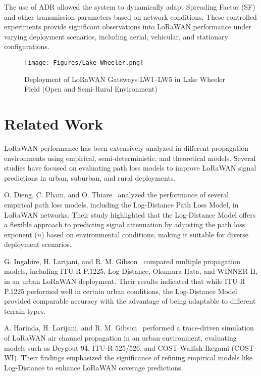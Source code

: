 \documentclass[journal]{IEEEtran}
\begin{document}
The use of ADR allowed the system to dynamically adapt Spreading Factor (SF) and other transmission parameters based on network conditions. These controlled experiments provide significant observations into LoRaWAN performance under varying deployment scenarios, including aerial, vehicular, and stationary configurations.

\begin{figure}[!t]
    \centering
    \texttt{[image: Figures/Lake Wheeler.png]}
    \caption{Deployment of LoRaWAN Gateways LW1–LW5 in Lake Wheeler Field (Open and Semi-Rural Environment)}
    \label{fig:LW}
\end{figure}

\section{Related Work}\label{sec:related_work}

LoRaWAN performance has been extensively analyzed in different propagation environments using empirical, semi-deterministic, and theoretical models. Several studies have focused on evaluating path loss models to improve LoRaWAN signal predictions in urban, suburban, and rural deployments.

O. Dieng, C. Pham, and O. Thiare~\cite{Dieng2020ComparingNetworks} analyzed the performance of several empirical path loss models, including the Log-Distance Path Loss Model, in LoRaWAN networks. Their study highlighted that the Log-Distance Model offers a flexible approach to predicting signal attenuation by adjusting the path loss exponent ($n$) based on environmental conditions, making it suitable for diverse deployment scenarios.

G. Ingabire, H. Larijani, and R. M. Gibson~\cite{Ingabire2020PerformanceEnvironment} compared multiple propagation models, including ITU-R P.1225, Log-Distance, Okumura-Hata, and WINNER II, in an urban LoRaWAN deployment. Their results indicated that while ITU-R P.1225 performed well in certain urban conditions, the Log-Distance Model provided comparable accuracy with the advantage of being adaptable to different terrain types.

A. Harinda, H. Larijani, and R. M. Gibson~\cite{Harinda2020Trace-drivenScenario} performed a trace-driven simulation of LoRaWAN air channel propagation in an urban environment, evaluating models such as Deygout 94, ITU-R 525/526, and COST-Walfish Ikegami (COST-WI). Their findings emphasized the significance of refining empirical models like Log-Distance to enhance LoRaWAN coverage predictions.
\end{document}
